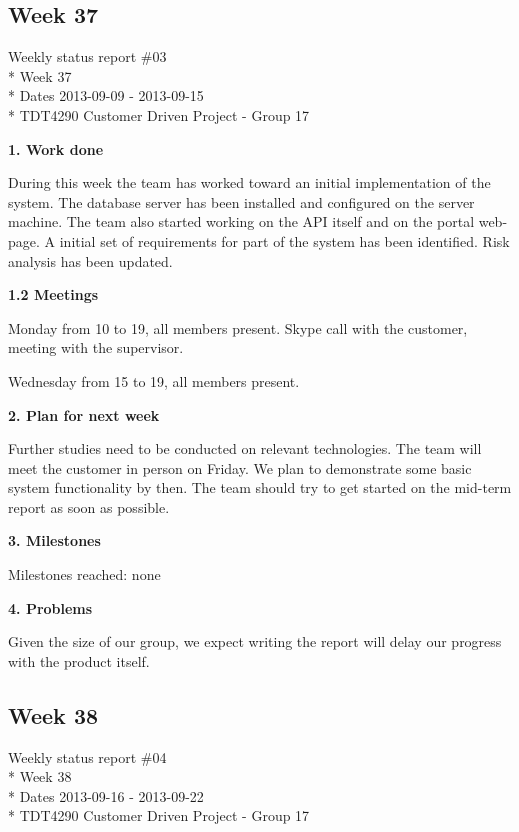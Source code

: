 \iffalse

\newpage
\subsection{Week 37}

\begin{center}
Weekly status report \#03\\*
Week 37 \\*
Dates 2013-09-09 - 2013-09-15 \\*
TDT4290 Customer Driven Project - Group 17
\end{center}

\textbf{1. Work done}

During this week the team has worked toward an initial implementation of the system. 
The database server has been installed and configured on the server machine. The team also started working on the API itself and on the portal web-page. 
A initial set of requirements for part of the system has been identified. Risk analysis has been updated.

\textbf{1.2 Meetings}

Monday
from 10 to 19, all members present.
Skype call with the customer, meeting with the supervisor.

Wednesday
from 15 to 19, all members present.

\textbf{2. Plan for next week}

Further studies need to be conducted on relevant technologies. 
The team will meet the customer in person on Friday. 
We plan to demonstrate some basic system functionality by then. 
The team should try to get started on the mid-term report as soon as possible.

\textbf{3. Milestones}

Milestones reached: none

\textbf{4. Problems}

Given the size of our group, we expect writing the report will delay our progress with the product itself.


\newpage
\subsection{Week 38}

\begin{center}
Weekly status report \#04\\*
Week 38 \\*
Dates 2013-09-16 - 2013-09-22 \\*
TDT4290 Customer Driven Project - Group 17
\end{center}

